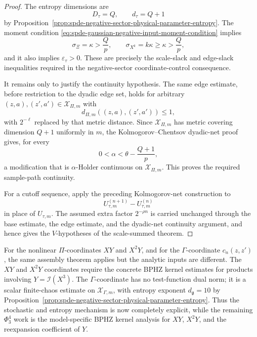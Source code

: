 \begin{proof}
The entropy dimensions are
\[
  D_\tau=Q,\qquad d_\tau=Q+1
\]
by Proposition~\ref{prop:spde-negative-sector-physical-parameter-entropy}.
The moment condition \eqref{eq:spde-gaussian-negative-input-moment-condition}
implies
\[
  \sigma_\Xi=\kappa>\frac Qp,
  \qquad
  \sigma_{X^k}=k\kappa\geq\kappa>\frac Qp,
\]
and it also implies \(\varepsilon_\tau>0\).  These are precisely the
scale-slack and edge-slack inequalities required in
the negative-sector coordinate-control consequence.

It remains only to justify the continuity hypothesis.  The same edge estimate,
before restriction to the dyadic edge set, holds for arbitrary
\((z,a),(z',a')\in\mathcal X_{\Pi,m}\) with
\[
  d_{\Pi,m}((z,a),(z',a'))\leq1,
\]
with \(2^{-\ell}\) replaced by that metric distance.  Since
\(\mathcal X_{\Pi,m}\) has metric covering dimension \(Q+1\) uniformly in
\(m\), the Kolmogorov--Chentsov dyadic-net proof gives, for every
\[
  0<\alpha<\theta-\frac{Q+1}{p},
\]
a modification that is \(\alpha\)-Holder continuous on
\(\mathcal X_{\Pi,m}\).  This proves the required sample-path continuity.

For a cutoff sequence, apply the preceding Kolmogorov-net construction to
\[
  U_{\tau,m}^{(n+1)}-U_{\tau,m}^{(n)}
\]
in place of \(U_{\tau,m}\).  The assumed extra factor \(2^{-\rho n}\) is
carried unchanged through the base estimate, the edge estimate, and the
dyadic-net continuity argument, and hence gives the \(V\)-hypotheses of the
scale-summed theorem.
\end{proof}

For the nonlinear \(\Pi\)-coordinates \(XY\) and \(X^2Y\), and for the
\(\Gamma\)-coordinate \(c_n(z,z')\), the same assembly theorem applies but
the analytic inputs are different.  The \(XY\) and \(X^2Y\) coordinates require
the concrete BPHZ kernel estimates for products involving
\(Y=\mathcal I(X^3)\).  The \(\Gamma\)-coordinate has no test-function dual
norm; it is a scalar finite-chaos estimate on
\(\mathcal X_{\Gamma,m}\), with entropy exponent \(d_{\mathfrak g}=10\) by
Proposition~\ref{prop:spde-negative-sector-physical-parameter-entropy}.  Thus
the stochastic and entropy mechanism is now completely explicit, while the
remaining \(\Phi^4_3\) work is the model-specific BPHZ kernel analysis for
\(XY\), \(X^2Y\), and the reexpansion coefficient of \(Y\).

